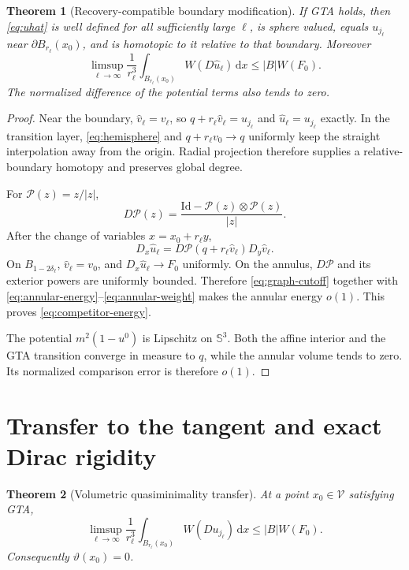 \documentclass[10pt]{article}
\newtheorem{theorem}{Theorem}[section]
\newcommand{\dd}{\,\mathrm d}
\newcommand{\SSS}{\mathbb S}
\newcommand{\cV}{\mathcal V}
\newcommand{\Id}{\mathrm{Id}}
\begin{document}
\begin{theorem}[Recovery-compatible boundary modification]
If GTA holds, then \eqref{eq:uhat} is well defined for all sufficiently
large $\ell$, is sphere valued, equals $u_{j_\ell}$ near
$\partial B_{r_\ell}(x_0)$, and is homotopic to it relative to that boundary.
Moreover
\begin{equation}
 \limsup_{\ell\to\infty}\frac1{r_\ell^3}
 \int_{B_{r_\ell}(x_0)}
 W(D\widehat u_\ell)\dd x
 \leq |B|W(F_0).                                       \label{eq:competitor-energy}
\end{equation}
The normalized difference of the potential terms also tends to zero.
\end{theorem}

\begin{proof}
Near the boundary, $\widehat v_\ell=v_\ell$, so
$q+r_\ell\widehat v_\ell=u_{j_\ell}$ and
$\widehat u_\ell=u_{j_\ell}$ exactly.  In the transition layer,
\eqref{eq:hemisphere} and $q+r_\ell v_0\to q$ uniformly keep the straight
interpolation away from the origin.  Radial projection therefore supplies a
relative-boundary homotopy and preserves global degree.

For $\mathcal P(z)=z/|z|$,
\begin{equation}
 D\mathcal P(z)=\frac{\Id-\mathcal P(z)\otimes\mathcal P(z)}{|z|}.
 \label{eq:DP}
\end{equation}
After the change of variables $x=x_0+r_\ell y$,
\[
 D_x\widehat u_\ell
 =D\mathcal P(q+r_\ell\widehat v_\ell)D_y\widehat v_\ell.
\]
On $B_{1-2\delta_\ell}$, $\widehat v_\ell=v_0$, and
$D_x\widehat u_\ell\to F_0$ uniformly.  On the annulus,
$D\mathcal P$ and its exterior powers are uniformly bounded.  Therefore
\eqref{eq:graph-cutoff} together with
\eqref{eq:annular-energy}--\eqref{eq:annular-weight} makes the annular
energy $o(1)$.  This proves \eqref{eq:competitor-energy}.

The potential $m^2(1-u^0)$ is Lipschitz on $\SSS^3$.  Both the affine
interior and the GTA transition converge in measure to $q$, while the
annular volume tends to zero.  Its normalized comparison error is therefore
$o(1)$.
\end{proof}

\section{Transfer to the tangent and exact Dirac rigidity}

\begin{theorem}[Volumetric quasiminimality transfer]
At a point $x_0\in\cV$ satisfying GTA,
\begin{equation}
 \limsup_{\ell\to\infty}\frac1{r_\ell^3}
 \int_{B_{r_\ell}(x_0)}W(Du_{j_\ell})\dd x
 \leq |B|W(F_0).                                       \label{eq:transfer}
\end{equation}
Consequently $\vartheta(x_0)=0$.
\end{theorem}
\end{document}
